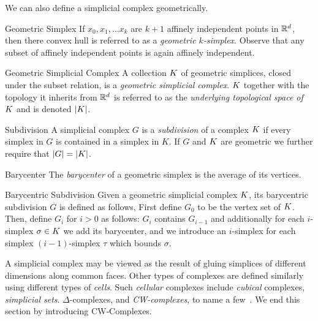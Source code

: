 We can also define a simplicial complex geometrically. 
\begin{definition}{Geometric Simplex}
If $x_0, x_1, \ldots x_k$ are $k+1$ affinely independent points in $\mathbb{R}^d$, then there convex hull is referred to as a \emph{geometric $k$-simplex}. Observe that any subset of affinely independent points is again affinely independent. 
\end{definition}
\begin{definition}{Geometric Simplicial Complex}
A collection $K$ of geometric simplices, closed under the subset relation, is a \emph{geometric simplicial complex}. $K$ together with the topology it inherits from $\mathbb{R}^d$ is referred to as the \emph{underlying topological space of $K$} and is denoted $|K|$. 
\end{definition}
\begin{definition}{Subdivision}
A simplicial complex $G$ is a \emph{subdivision} of a complex $K$ if every simplex in $G$ is contained in a simplex in $K$. If $G$ and $K$ are geometric we further require that $|G| = |K|$.
\end{definition}
\begin{definition}{Barycenter}
The \emph{barycenter} of a geometric simplex is the average of its vertices.
\end{definition}
\begin{definition}{Barycentric Subdivision}
Given a geometric simplicial complex $K$, its barycentric subdivision $G$ is defined as follows, First define $G_0$ to be the vertex set of $K$. Then, define $G_i$ for $i > 0$ as follows: $G_i$ contains $G_{i-1}$ and additionally for each $i$-simplex $\sigma  \in K$ we add its barycenter, and we introduce an $i$-simplex for each simplex $(i-1)$-simplex $\tau$ which bounds $\sigma$.
\end{definition}

A simplicial complex may be viewed as the result of gluing simplices of 
different dimensions along common faces. Other types of complexes are defined 
similarly using different types of \emph{cells}. Such \emph{cellular} complexes include \emph{cubical} complexes, \emph{simplicial sets}. $\Delta$-complexes, and \emph{CW-complexes}, 
to name a few~\cite{ez-ssc-50,hatcher,kmm-ch-04,m-soat-68}. We end this section by introducing CW-Complexes.

